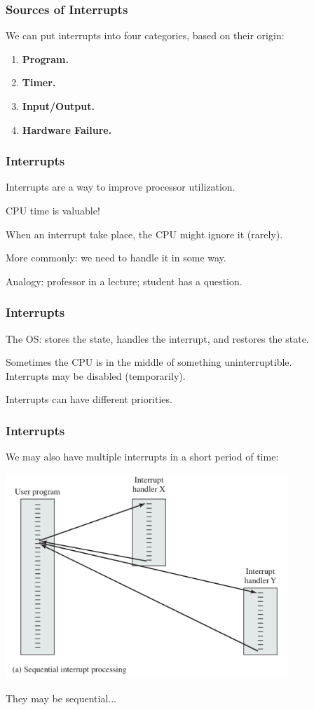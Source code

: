 \begin{frame}
\frametitle{Sources of Interrupts}

We can put interrupts into four categories, based on their origin:

\begin{enumerate}
	\item \textbf{Program.}
	\item \textbf{Timer.}
	\item \textbf{Input/Output.}
	\item \textbf{Hardware Failure.}
\end{enumerate}


\end{frame}

\begin{frame}
\frametitle{Interrupts}
Interrupts are a way to improve processor utilization.

CPU time is valuable!

When an interrupt take place, the CPU might ignore it (rarely).

More commonly: we need to \alert{handle} it in some way.

Analogy: professor in a lecture; student has a question.


\end{frame}

\begin{frame}
\frametitle{Interrupts}
The OS: stores the state, handles the interrupt, and restores the state.

Sometimes the CPU is in the middle of something uninterruptible.\\
\quad Interrupts may be disabled (temporarily).

Interrupts can have different priorities.
\end{frame}

\begin{frame}
\frametitle{Interrupts}

We may also have multiple interrupts in a short period of time:

\begin{center}
\includegraphics[width=0.8\textwidth]{images/interrupts-seq.png}
\end{center}

They may be sequential...

\end{frame}

